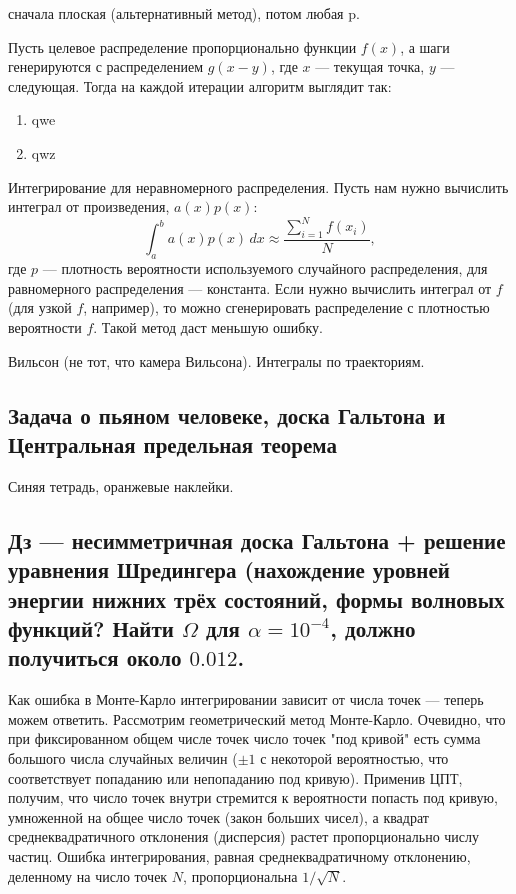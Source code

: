 \documentclass{book}
\begin{document}
\clearpage

сначала плоская (альтернативный метод), потом любая p.

Пусть целевое распределение пропорционально функции $f(x)$, а шаги генерируются с распределением
$g(x - y)$, где $x$ --- текущая точка, $y$ --- следующая. Тогда на каждой итерации алгоритм
выглядит так:
\begin{enumerate}
    \item qwe
    \item qwz
\end{enumerate}

Интегрирование для неравномерного распределения. Пусть нам нужно вычислить интеграл от
произведения, $a(x) p(x)$:
\begin{equation}
    \int_a^b a(x) p(x) \, dx \approx \frac{\sum_{i=1}^N f(x_i)}{N},
\end{equation}
где $p$ --- плотность вероятности используемого случайного распределения, для равномерного
распределения --- константа. Если нужно вычислить интеграл от $f$ (для узкой $f$, например), то
можно сгенерировать распределение с плотностью вероятности $f$. Такой метод даст
меньшую ошибку.

Вильсон (не тот, что камера Вильсона). Интегралы по траекториям.

\subsection{Задача о пьяном человеке, доска Гальтона и Центральная предельная теорема}

Синяя тетрадь, оранжевые наклейки.

\subsection{Дз --- несимметричная доска Гальтона + решение уравнения Шредингера (нахождение уровней
энергии нижних трёх состояний, формы волновых функций? Найти $\Omega$ для $\alpha = 10^{-4}$,
должно получиться около $0.012$.}

Как ошибка в Монте-Карло интегрировании зависит от числа точек --- теперь можем ответить.
Рассмотрим геометрический метод Монте-Карло. Очевидно, что при фиксированном общем числе точек
число точек "под кривой" есть сумма большого числа случайных величин ($\pm 1$ с некоторой вероятностью, что
соответствует попаданию или непопаданию под кривую). Применив ЦПТ, получим, что число точек внутри
стремится к вероятности попасть под кривую, умноженной на общее число точек (закон больших чисел), а квадрат
среднеквадратичного отклонения (дисперсия) растет пропорционально числу частиц. Ошибка
интегрирования, равная среднеквадратичному отклонению, деленному на число точек $N$,
пропорциональна $1 / \sqrt{N}$.
\end{document}
